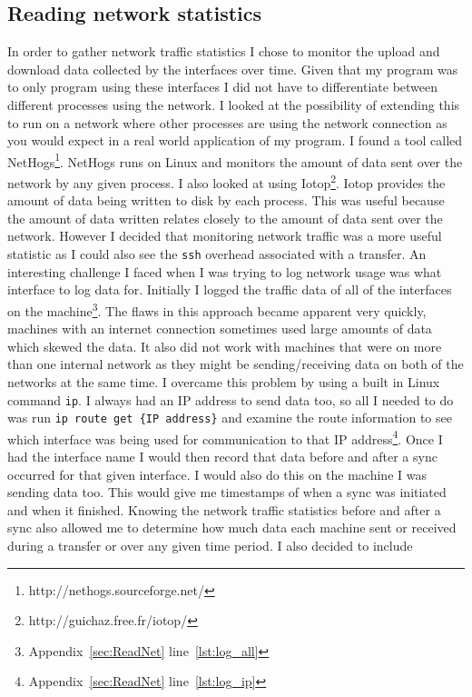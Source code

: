 \documentclass[12pt]{article}
\begin{document}
\subsection{Reading network statistics}
\label{sec:iface_mon}
In order to gather network traffic statistics
I chose to monitor the upload and download
data collected by the interfaces over time.
Given that my program was to only program
using these interfaces I did not have to
differentiate between different processes
using the network.
I looked at the possibility of extending this
to run on a network where other processes
are using the network connection as you
would expect in a real world application
of my program. I found a tool called
NetHogs\footnote{http://nethogs.sourceforge.net/}.
NetHogs runs on Linux and monitors the
amount of data sent over the network by any
given process. I also looked at 
using Iotop\footnote{http://guichaz.free.fr/iotop/}.
Iotop provides the amount of data being written
to disk by each process. This was useful because
the amount of data written relates closely to the amount
of data sent over the network.
However I decided that monitoring
network traffic was a more useful statistic
as I could also see the \texttt{ssh} overhead
associated with a transfer.
An interesting challenge I faced when I was trying
to log network usage was what interface to log
data for. Initially I logged the traffic data of all of the
interfaces on the machine\footnote{Appendix~\ref{sec:ReadNet}
line~\ref{lst:log_all}}. The flaws in this approach
became apparent very quickly, machines with an
internet connection sometimes used large amounts
of data which skewed the data. It also did not work
with machines that were on more than one internal
network as they might be sending/receiving data
on both of the networks at the same time. I overcame
this problem by using a built in Linux command \texttt{ip}.
I always had an IP address to send data too, so all
I needed to do was run \texttt{ip route get \{IP address\}}
and examine the route information to see which interface
was being used for communication to that IP 
address\footnote{Appendix~\ref{sec:ReadNet} line~\ref{lst:log_ip}}.
Once I had the interface name I would then record that
data before and after a sync occurred for that given
interface. I would also do this on the machine I
was sending data too. This would give me timestamps
of when a sync was initiated and when it finished.
Knowing the network traffic statistics before and after
a sync also allowed me to determine how much data each
machine sent or received during a transfer or over
any given time period. I also decided to include
\end{document}
